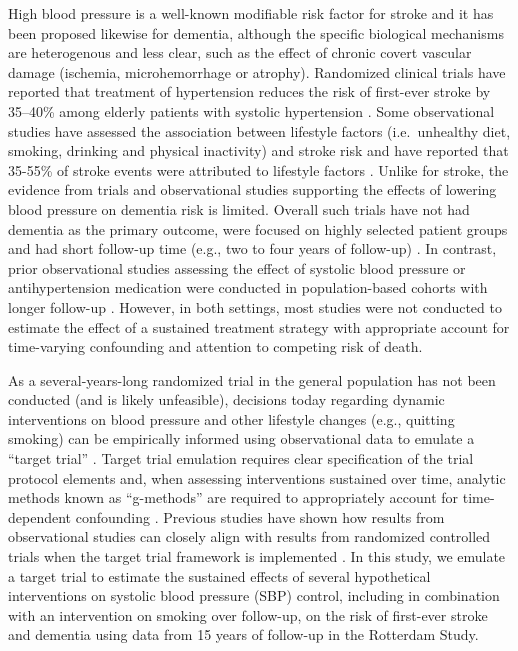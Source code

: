 \documentclass[
]{book}
\begin{document}
High blood pressure is a well-known modifiable risk factor for stroke\autocite{johnson2019} and it has been proposed likewise for dementia\autocite{lancet2020}, although the specific biological mechanisms are heterogenous and less clear, such as the effect of chronic covert vascular damage (ischemia, microhemorrhage or atrophy)\autocite{hughes2020}. Randomized clinical trials have reported that treatment of hypertension reduces the risk of first-ever stroke by 35--40\% among elderly patients with systolic hypertension \autocite{ace_inhibitors2000,chobanian2003}. Some observational studies have assessed the association between lifestyle factors (i.e.~unhealthy diet, smoking, drinking and physical inactivity) and stroke risk and have reported that 35-55\% of stroke events were attributed to lifestyle factors \autocite{braillon2015,zhang2012,prince1996}. Unlike for stroke, the evidence from trials and observational studies supporting the effects of lowering blood pressure on dementia risk is limited. Overall such trials have not had dementia as the primary outcome, were focused on highly selected patient groups and had short follow-up time (e.g., two to four years of follow-up) \autocite{ace_inhibitors2000,prince1996,forette2002,progress2003,lithell2003,diener2008,anderson2011,williamson2019,ding2020}. In contrast, prior observational studies assessing the effect of systolic blood pressure or antihypertension medication were conducted in population-based cohorts with longer follow-up \autocite{ding2020,liang2018}. However, in both settings, most studies were not conducted to estimate the effect of a sustained treatment strategy with appropriate account for time-varying confounding and attention to competing risk of death.

As a several-years-long randomized trial in the general population has not been conducted (and is likely unfeasible), decisions today regarding dynamic interventions on blood pressure and other lifestyle changes (e.g., quitting smoking) can be empirically informed using observational data to emulate a ``target trial'' \autocite{zhang2018,taubman2009,jain2016,danaei2018,garcia-aymerich2014}. Target trial emulation requires clear specification of the trial protocol elements and, when assessing interventions sustained over time, analytic methods known as ``g-methods'' are required to appropriately account for time-dependent confounding \autocite{whatif2020}. Previous studies have shown how results from observational studies can closely align with results from randomized controlled trials when the target trial framework is implemented \autocite{lodi2019,hernan2008}. In this study, we emulate a target trial to estimate the sustained effects of several hypothetical interventions on systolic blood pressure (SBP) control, including in combination with an intervention on smoking over follow-up, on the risk of first-ever stroke and dementia using data from 15 years of follow-up in the Rotterdam Study.
\end{document}
